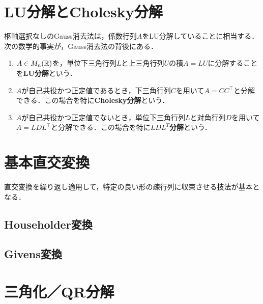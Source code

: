 \documentclass[uplatex, dvipdfmx]{jsreport}
\begin{document}
\section{LU分解とCholesky分解}

\begin{tcolorbox}[colframe=ForestGreen, colback=ForestGreen!10!white,breakable,colbacktitle=ForestGreen!40!white,coltitle=black,fonttitle=\bfseries\sffamily,
title=]
    枢軸選択なしのGauss消去法は，係数行列$A$をLU分解していることに相当する．
    次の数学的事実が，Gauss消去法の背後にある．
\end{tcolorbox}

\begin{definition}\mbox{}
    \begin{enumerate}
        \item $A\in M_n(\mathbb{R})$を，単位下三角行列$L$と上三角行列$U$の積$A=LU$に分解することを\textbf{LU分解}という．
        \item $A$が自己共役かつ正定値であるとき，下三角行列$C$を用いて$A=CC^\top$と分解できる．この場合を特に\textbf{Cholesky分解}という．
        \item $A$が自己共役かつ正定値でないとき，単位下三角行列$L$と対角行列$D$を用いて$A=LDL^\top$と分解できる．この場合を特に\textbf{$LDL^T$分解}という．
    \end{enumerate}
\end{definition}

\section{基本直交変換}

\begin{tcolorbox}[colframe=ForestGreen, colback=ForestGreen!10!white,breakable,colbacktitle=ForestGreen!40!white,coltitle=black,fonttitle=\bfseries\sffamily,
title=]
    直交変換を繰り返し適用して，特定の良い形の疎行列に収束させる技法が基本となる．
\end{tcolorbox}

\subsection{Householder変換}

\subsection{Givens変換}

\section{三角化／QR分解}
\end{document}
